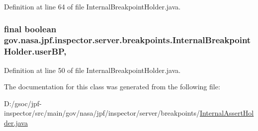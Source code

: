 Definition at line 64 of file Internal\+Breakpoint\+Holder.\+java.

\subsubsection[{\texorpdfstring{user\+BP}{userBP}}]{\setlength{\rightskip}{0pt plus 5cm}final boolean gov.\+nasa.\+jpf.\+inspector.\+server.\+breakpoints.\+Internal\+Breakpoint\+Holder.\+user\+BP\hspace{0.3cm}{\ttfamily [protected]}, {\ttfamily [inherited]}}\hypertarget{classgov_1_1nasa_1_1jpf_1_1inspector_1_1server_1_1breakpoints_1_1_internal_breakpoint_holder_a3e610f11675553b389c51a824b68a69d}{}\label{classgov_1_1nasa_1_1jpf_1_1inspector_1_1server_1_1breakpoints_1_1_internal_breakpoint_holder_a3e610f11675553b389c51a824b68a69d}


Definition at line 50 of file Internal\+Breakpoint\+Holder.\+java.



The documentation for this class was generated from the following file\+:\begin{DoxyCompactItemize}
\item 
D\+:/gsoc/jpf-\/inspector/src/main/gov/nasa/jpf/inspector/server/breakpoints/\hyperlink{_internal_assert_holder_8java}{Internal\+Assert\+Holder.\+java}\end{DoxyCompactItemize}
